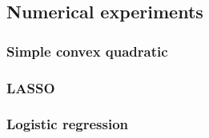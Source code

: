 \documentclass[12pt]{article}
\begin{document}
    \subsection{Numerical experiments}

        \subsubsection{Simple convex quadratic}
        \subsubsection{LASSO}
        \subsubsection{Logistic regression}





\appendix
\end{document}
